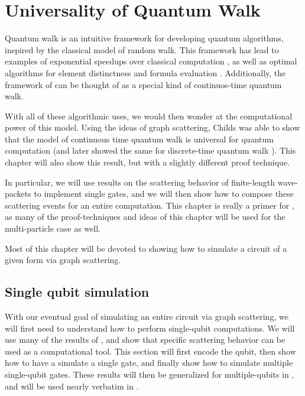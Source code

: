 \documentclass[../thesis-main/thesis-main]{subfiles}
\begin{document}
\chapter{Universality of Quantum Walk}
\label{chap:SP_universality}


Quantum walk is an intuitive framework for developing quantum algorithms, inspired by the classical model of random walk.  This framework has lead to examples of exponential speedups over classical computation \cite{CCDFGS03}, as well as optimal algorithms for element distinctness \cite{Amb07} and formula evaluation \cite{FGG08}.  Additionally, the framework of  can be thought of as a special kind of continuos-time quantum walk.

With all of these algorithmic uses, we would then wonder at the computational power of this model.  Using the ideas of graph scattering, Childs \cite{Chi09} was able to show that the model of continuous time quantum walk is universal for quantum computation (and later showed the same for discrete-time quantum walk \cite{Chi10}).  This chapter will also show this result, but with a slightly different proof technique.

In particular, we will use results on the scattering behavior of finite-length wave-packets to implement single gates, and we will then show how to compose these scattering events for an entire computation.  This chapter is really a primer for , as many of the proof-techniques and ideas of this chapter will be used for the multi-particle case as well.

Most of this chapter will be devoted to showing how to simulate a circuit of a given form via graph scattering.





\section{Single qubit simulation}\label{sec:single_qubit_computations}

With our eventual goal of simulating an entire circuit via graph scattering, we will first need to understand how to perform single-qubit computations.  We will use many of the results of , and show that specific scattering behavior can be used as a computational tool.  This section will first encode the qubit, then show how to have a simulate a single gate, and finally show how to simulate multiple single-qubit gates.   These results will then be generalized for multiple-qubits in , and will be used nearly verbatim in .
\end{document}
